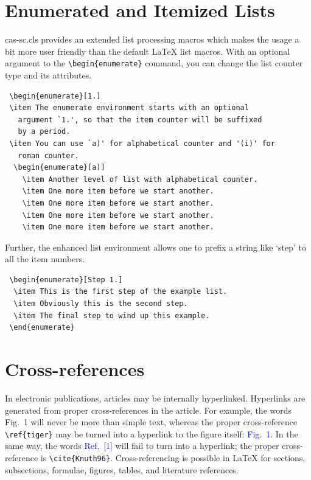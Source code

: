\documentclass[a4paper,fleqn]{cas-sc}
\begin{document}
\section[Enumerated ...]{Enumerated and Itemized Lists}
{cas-sc.cls} provides an extended list processing macros
which makes the usage a bit more user friendly than the default
\LaTeX{} list macros.   With an optional argument to the
\verb+\begin{enumerate}+ command, you can change the list counter
type and its attributes.

\begin{verbatim}
 \begin{enumerate}[1.]
 \item The enumerate environment starts with an optional
   argument `1.', so that the item counter will be suffixed
   by a period.
 \item You can use `a)' for alphabetical counter and '(i)' for
   roman counter.
  \begin{enumerate}[a)]
    \item Another level of list with alphabetical counter.
    \item One more item before we start another.
    \item One more item before we start another.
    \item One more item before we start another.
    \item One more item before we start another.
\end{verbatim}

Further, the enhanced list environment allows one to prefix a
string like `step' to all the item numbers.  

\begin{verbatim}
 \begin{enumerate}[Step 1.]
  \item This is the first step of the example list.
  \item Obviously this is the second step.
  \item The final step to wind up this example.
 \end{enumerate}
\end{verbatim}

\section{Cross-references}
In electronic publications, articles may be internally
hyperlinked. Hyperlinks are generated from proper
cross-references in the article.  For example, the words
\textcolor{black!80}{Fig.~1} will never be more than simple text,
whereas the proper cross-reference \verb+\ref{tiger}+ may be
turned into a hyperlink to the figure itself:
\textcolor{blue}{Fig.~1}.  In the same way,
the words \textcolor{blue}{Ref.~[1]} will fail to turn into a
hyperlink; the proper cross-reference is \verb+\cite{Knuth96}+.
Cross-referencing is possible in \LaTeX{} for sections,
subsections, formulae, figures, tables, and literature
references.
\end{document}
